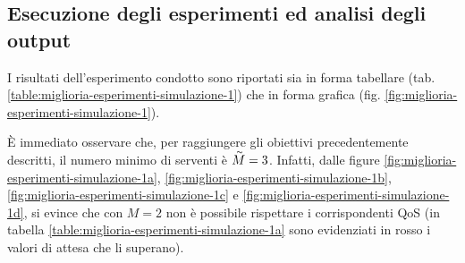 \subsection{Esecuzione degli esperimenti ed analisi degli output}
I risultati dell'esperimento condotto sono riportati sia in forma tabellare (tab. \ref{table:miglioria-esperimenti-simulazione-1}) che in forma grafica (fig. \ref{fig:miglioria-esperimenti-simulazione-1}).

È immediato osservare che, per raggiungere gli obiettivi precedentemente descritti, il numero minimo di serventi è $\accentset{\sim}{M} = 3$. Infatti, dalle figure \ref{fig:miglioria-esperimenti-simulazione-1a}, \ref{fig:miglioria-esperimenti-simulazione-1b}, \ref{fig:miglioria-esperimenti-simulazione-1c} e \ref{fig:miglioria-esperimenti-simulazione-1d}, si evince che con $M = 2$ non è possibile rispettare i corrispondenti QoS (in tabella \ref{table:miglioria-esperimenti-simulazione-1a} sono evidenziati in {\color{red}rosso} i valori di attesa che li superano).

\newpage

